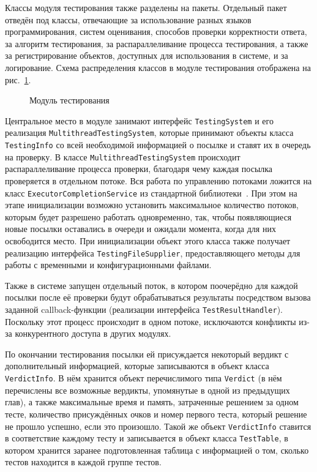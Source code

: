 Классы модуля тестирования также разделены на пакеты. Отдельный пакет отведён под классы, отвечающие за использование разных языков программирования, систем оценивания, способов проверки корректности ответа, за алгоритм тестирования, за распараллеливание процесса тестирования, а также за регистрирование объектов, доступных для использования в системе, и за логирование. Схема распределения классов в модуле тестирования отображена на рис.~\ref{package_diagram_testing}.

\begin{figure}[h]
\caption{Модуль тестирования}
\label{package_diagram_testing}
\end{figure}

Центральное место в модуле занимают интерфейс \texttt{Testing\-System} и его реализация \texttt{Multithread\-Testing\-System}, которые принимают объекты класса \texttt{Tes\-ting\-Info} со всей необходимой информацией о посылке и ставят их в очередь на проверку. В классе \texttt{Multithread\-Testing\-System} происходит распараллеливание процесса проверки, благодаря чему каждая посылка проверяется в отдельном потоке. Вся работа по управлению потоками ложится на класс \texttt{Executor\-Completion\-Service} из стандартной библиотеки~\cite{cornell1}. При этом на этапе инициализации возможно установить максимальное количество потоков, которым будет разрешено работать одновременно, так, чтобы появляющиеся новые посылки оставались в очереди и ожидали момента, когда для них освободится место. При инициализации объект этого класса также получает реализацию интерфейса \texttt{Testing\-File\-Supplier}, предоставляющего методы для работы с временными и конфигурационными файлами.

Также в системе запущен отдельный поток, в котором поочерёдно для каждой посылки после её проверки будут обрабатываться результаты посредством вызова заданной callback-функции (реализации интерфейса \texttt{Test\-Result\-Handler}). Поскольку этот процесс происходит в одном потоке, исключаются конфликты из-за конкурентного доступа в других модулях.

По окончании тестирования посылки ей присуждается некоторый вердикт с дополнительный информацией, которые записываются в объект класса \texttt{Verdict\-Info}. В нём хранится объект перечислимого типа \texttt{Verdict} (в нём перечислены все возможные вердикты, упомянутые в одной из предыдущих глав), а также максимальные время и память, затраченные решением за одном тесте, количество присуждённых очков и номер первого теста, который решение не прошло успешно, если это произошло. Такой же объект \texttt{Verdict\-Info} ставится в соответствие каждому тесту и записывается в объект класса \texttt{Test\-Table}, в котором хранится заранее подготовленная таблица с информацией о том, сколько тестов находится в каждой группе тестов.

